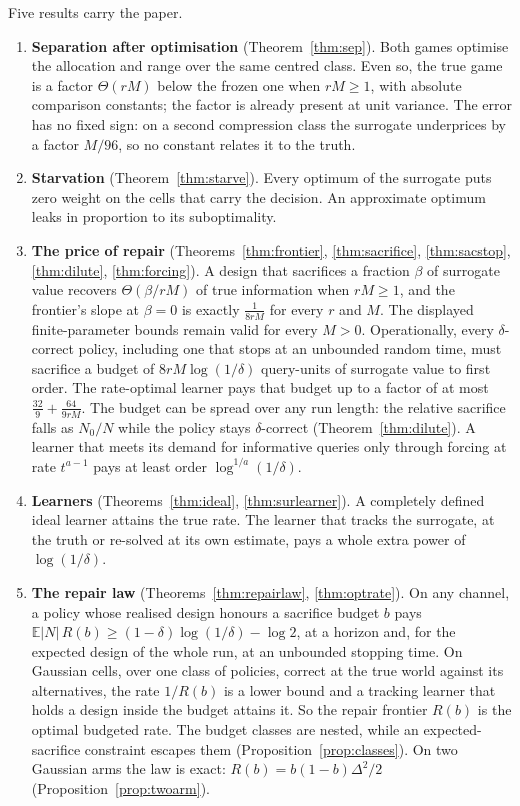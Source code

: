 Five results carry the paper.
\begin{enumerate}
\item[1)] \textbf{Separation after optimisation} (Theorem~\ref{thm:sep}). Both games optimise
the allocation and range over the same centred class. Even so, the true game is a factor
$\Theta(rM)$ below the frozen one when $rM\ge1$, with absolute comparison constants; the factor is already present at unit variance. The
error has no fixed sign: on a second compression class the surrogate underprices by a factor
$M/96$, so no constant relates it to the truth.
\item[2)] \textbf{Starvation} (Theorem~\ref{thm:starve}). Every optimum of the surrogate puts
zero weight on the cells that carry the decision. An approximate optimum leaks in proportion
to its suboptimality.
\item[3)] \textbf{The price of repair} (Theorems~\ref{thm:frontier}, \ref{thm:sacrifice},
\ref{thm:sacstop}, \ref{thm:dilute}, \ref{thm:forcing}). A design that sacrifices a fraction
$\beta$ of surrogate value recovers $\Theta(\beta/rM)$ of true information when $rM\ge1$, and
the frontier's slope at $\beta=0$ is exactly $\frac{1}{8rM}$ for every $r$ and $M$. The displayed finite-parameter bounds remain valid for every $M>0$. Operationally, every
$\delta$-correct policy, including one that stops at an unbounded random time, must sacrifice a
budget of $8rM\log(1/\delta)$ query-units of surrogate value to first order. The rate-optimal
learner pays that budget up to a factor of at most $\frac{32}{9}+\frac{64}{9rM}$.
The budget can be spread over any run length: the relative sacrifice falls as $N_{0}/N$ while
the policy stays $\delta$-correct (Theorem~\ref{thm:dilute}).
A learner that meets its demand for informative queries only through forcing at rate
$t^{a-1}$ pays at least order $\log^{1/a}(1/\delta)$.
\item[4)] \textbf{Learners} (Theorems~\ref{thm:ideal}, \ref{thm:surlearner}). A completely
defined ideal learner attains the true rate. The learner that tracks the surrogate, at the
truth or re-solved at its own estimate, pays a whole extra power of $\log(1/\delta)$.
\item[5)] \textbf{The repair law} (Theorems~\ref{thm:repairlaw}, \ref{thm:optrate}). On any
channel, a policy whose realised design honours a sacrifice budget $b$ pays
$\mathbb E|N|\,R(b)\ge(1-\delta)\log(1/\delta)-\log2$, at a horizon and, for the expected
design of the whole run, at an unbounded stopping time. On Gaussian cells, over one class of
policies, correct at the true world against its alternatives, the rate $1/R(b)$ is a lower bound
and a tracking learner that holds a design inside the budget attains it. So the repair frontier $R(b)$ is the optimal budgeted rate. The budget classes are nested, while an
expected-sacrifice constraint escapes them (Proposition~\ref{prop:classes}). On two Gaussian
arms the law is exact: $R(b)=b(1-b)\Delta^2/2$ (Proposition~\ref{prop:twoarm}).
\end{enumerate}
